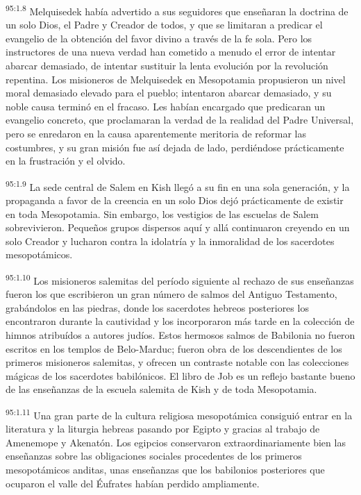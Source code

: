 \par
\textsuperscript{95:1.8} Melquisedek había advertido a sus seguidores que enseñaran la doctrina de un solo Dios, el Padre y Creador de todos, y que se limitaran a predicar el evangelio de la obtención del favor divino a través de la fe sola. Pero los instructores de una nueva verdad han cometido a menudo el error de intentar abarcar demasiado, de intentar sustituir la lenta evolución por la revolución repentina. Los misioneros de Melquisedek en Mesopotamia propusieron un nivel moral demasiado elevado para el pueblo; intentaron abarcar demasiado, y su noble causa terminó en el fracaso. Les habían encargado que predicaran un evangelio concreto, que proclamaran la verdad de la realidad del Padre Universal, pero se enredaron en la causa aparentemente meritoria de reformar las costumbres, y su gran misión fue así dejada de lado, perdiéndose prácticamente en la frustración y el olvido.

\par
\textsuperscript{95:1.9} La sede central de Salem en Kish llegó a su fin en una sola generación, y la propaganda a favor de la creencia en un solo Dios dejó prácticamente de existir en toda Mesopotamia. Sin embargo, los vestigios de las escuelas de Salem sobrevivieron. Pequeños grupos dispersos aquí y allá continuaron creyendo en un solo Creador y lucharon contra la idolatría y la inmoralidad de los sacerdotes mesopotámicos.

\par
\textsuperscript{95:1.10} Los misioneros salemitas del período siguiente al rechazo de sus enseñanzas fueron los que escribieron un gran número de salmos del Antiguo Testamento, grabándolos en las piedras, donde los sacerdotes hebreos posteriores los encontraron durante la cautividad y los incorporaron más tarde en la colección de himnos atribuídos a autores judíos. Estos hermosos salmos de Babilonia no fueron escritos en los templos de Belo-Marduc; fueron obra de los descendientes de los primeros misioneros salemitas, y ofrecen un contraste notable con las colecciones mágicas de los sacerdotes babilónicos. El libro de Job es un reflejo bastante bueno de las enseñanzas de la escuela salemita de Kish y de toda Mesopotamia.

\par
\textsuperscript{95:1.11} Una gran parte de la cultura religiosa mesopotámica consiguió entrar en la literatura y la liturgia hebreas pasando por Egipto y gracias al trabajo de Amenemope y Akenatón. Los egipcios conservaron extraordinariamente bien las enseñanzas sobre las obligaciones sociales procedentes de los primeros mesopotámicos anditas, unas enseñanzas que los babilonios posteriores que ocuparon el valle del Éufrates habían perdido ampliamente.

